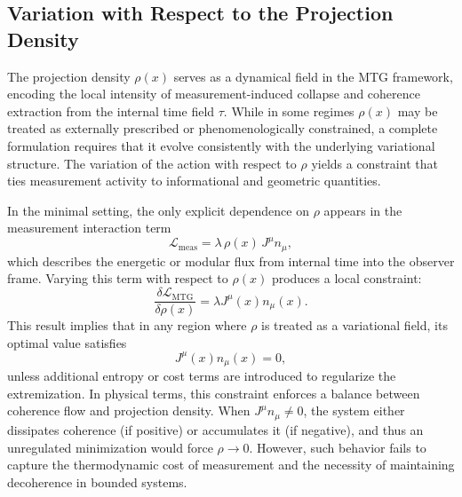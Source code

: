 \documentclass[11pt]{article}
\begin{document}
\subsection{Variation with Respect to the Projection Density}

The projection density \( \rho(x) \) serves as a dynamical field in the MTG framework, encoding the local intensity of measurement-induced collapse and coherence extraction from the internal time field \( \tau \). While in some regimes \( \rho(x) \) may be treated as externally prescribed or phenomenologically constrained, a complete formulation requires that it evolve consistently with the underlying variational structure. The variation of the action with respect to \( \rho \) yields a constraint that ties measurement activity to informational and geometric quantities.

In the minimal setting, the only explicit dependence on \( \rho \) appears in the measurement interaction term
\begin{equation}\label{eq:L_meas}
\mathcal{L}_{\mathrm{meas}} = \lambda \, \rho(x) \, J^\mu n_\mu,
\end{equation}
which describes the energetic or modular flux from internal time into the observer frame. Varying this term with respect to \( \rho(x) \) produces a local constraint:
\begin{equation}
\frac{\delta \mathcal{L}_{\mathrm{MTG}}}{\delta \rho(x)} = \lambda J^\mu(x) n_\mu(x).
\end{equation}
This result implies that in any region where \( \rho \) is treated as a variational field, its optimal value satisfies
\begin{equation}
J^\mu(x) n_\mu(x) = 0,
\end{equation}
unless additional entropy or cost terms are introduced to regularize the extremization. In physical terms, this constraint enforces a balance between coherence flow and projection density. When \( J^\mu n_\mu \neq 0 \), the system either dissipates coherence (if positive) or accumulates it (if negative), and thus an unregulated minimization would force \( \rho \rightarrow 0 \). However, such behavior fails to capture the thermodynamic cost of measurement and the necessity of maintaining decoherence in bounded systems.
\end{document}
